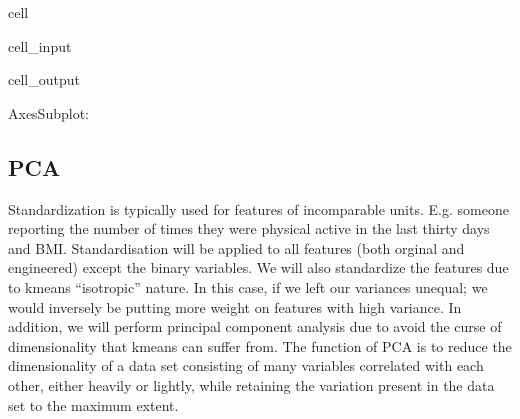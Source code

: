 \documentclass[letterpaper,10pt,english]{jupyterBook}
\begin{document}
\begin{sphinxuseclass}{cell}\begin{sphinxVerbatimInput}

\begin{sphinxuseclass}{cell_input}
\begin{sphinxVerbatim}[commandchars=\\\{\}]
\PYG{p}{[}\PYG{p}{]}   \PYG{p}{[}\PYG{p}{]}
\PYG{p}{[}\PYG{p}{]}
\end{sphinxVerbatim}

\end{sphinxuseclass}\end{sphinxVerbatimInput}
\begin{sphinxVerbatimOutput}

\begin{sphinxuseclass}{cell_output}
\begin{sphinxVerbatim}[commandchars=\\\{\}]
\PYGZlt{}AxesSubplot: \PYGZgt{}
\end{sphinxVerbatim}

\noindent{}

\end{sphinxuseclass}\end{sphinxVerbatimOutput}

\end{sphinxuseclass}

\subsection{PCA}
\label{\detokenize{Initial_Data_Exploration:pca}}
\sphinxAtStartPar
Standardization is typically used for features of incomparable units. E.g. someone reporting the number of times they were physical active in the last thirty days and BMI. Standardisation will be applied to all features (both orginal and engineered) except the binary variables. We will also standardize the features due to k\sphinxhyphen{}means “isotropic” nature. In this case, if we left our variances unequal; we would inversely be putting more weight on features with high variance. In addition, we will perform principal component analysis due to avoid the curse of dimensionality that k\sphinxhyphen{}means can suffer from. The function of PCA is to reduce the dimensionality of a data set consisting of many variables correlated with each other, either heavily or lightly, while retaining the variation present in the data set to the maximum extent.
\end{document}
